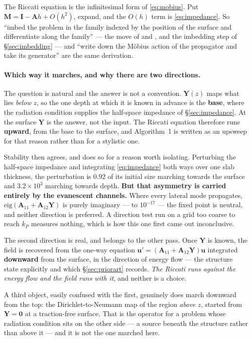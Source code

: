 \documentclass[11pt,a4paper]{article}
\newcommand{\bA}{\mathbf{A}}
\newcommand{\bu}{\mathbf{u}}
\newcommand{\bY}{\mathbf{Y}}
\newcommand{\bM}{\mathbf{M}}
\begin{document}
The Riccati equation is the infinitesimal form of \eqref{eq:mobius}.  Put
$\bM=\mathbf{I}-\bA h+O(h^{2})$, expand, and the $O(h)$ term is
\eqref{eq:impedance}.  So ``imbed the problem in the family indexed by the
position of the surface and differentiate along the family'' --- the move of
\cite{bellman1959} and \cite{mccoy1986}, and the imbedding step of
\S\ref{sec:imbedding} --- and ``write down the M\"obius action of the propagator
and take its generator'' are the same derivation.

\paragraph{Which way it marches, and why there are two directions.}  The
question is natural and the answer is not a convention.  $\bY(z)$ maps what lies
\emph{below} $z$, so the one depth at which it is known in advance is the
\textbf{base}, where the radiation condition supplies the half-space impedance
of \S\ref{sec:impedance}.  At the surface $\bY$ is the answer, not the input.
The Riccati equation therefore runs \textbf{upward}, from the base to the
surface, and Algorithm~1 is written as an upsweep for that reason rather than
for a stylistic one.

Stability then agrees, and does so for a reason worth isolating.  Perturbing the
half-space impedance and integrating \eqref{eq:impedance} both ways over one
slab thickness, the perturbation is $0.92$ of its initial size marching towards
the surface and $3.2\times10^{3}$ marching towards depth.  \textbf{But that
asymmetry is carried entirely by the evanescent channels.}  Where every lateral
mode propagates, $\mathrm{eig}(\bA_{11}+\bA_{12}\bY)$ is purely imaginary --- to
$10^{-17}$ --- the fixed point is neutral, and neither direction is preferred.
A direction test run on a grid too coarse to reach $k_P$ measures nothing, which
is how this one first came out inconclusive.

The second direction is real, and belongs to the other pass.  Once $\bY$ is
known, the field is recovered from the one-way equation
$\bu'=(\bA_{11}+\bA_{12}\bY)\bu$ integrated \textbf{downward} from the surface,
in the direction of energy flow --- the structure \cite{haines2004} state
explicitly and which \S\ref{sec:priorart} records.  \emph{The Riccati runs
against the energy flow and the field runs with it}, and neither is a choice.

A third object, easily confused with the first, genuinely does march downward
from the top: the Dirichlet-to-Neumann map of the region \emph{above} $z$,
started from $\bY=\mathbf{0}$ at a traction-free surface.  That is the operator
for a problem whose radiation condition sits on the other side --- a source
beneath the structure rather than above it --- and it is not the one marched
here.
\end{document}
